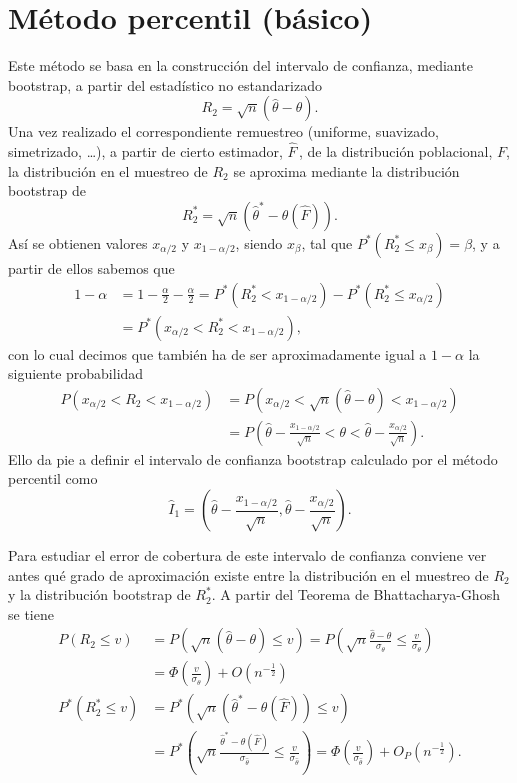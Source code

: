 \documentclass[]{book}
\theoremstyle{definition}
\theoremstyle{definition}
\theoremstyle{definition}
\theoremstyle{remark}
\begin{document}
\section{Método percentil (básico)}\label{cap5_basic}

Este método se basa en la construcción del intervalo de confianza,
mediante bootstrap, a partir del estadístico no estandarizado
\[R_2=\sqrt{n}\left( \hat{\theta}-\theta \right).\] Una vez realizado el
correspondiente remuestreo (uniforme, suavizado, simetrizado, \ldots{}),
a partir de cierto estimador, \(\hat{F}\,\), de la distribución
poblacional, \(F\), la distribución en el muestreo de \(R_2\) se
aproxima mediante la distribución bootstrap de
\[R_2^{\ast}=\sqrt{n}\left( \hat{\theta}^{\ast}-\theta \left( \hat{F}
 \right) \right).\] Así se obtienen valores \(x_{\alpha /2}\) y
\(x_{1-\alpha /2}\), siendo \(x_{\beta }\), tal que
\(P^{\ast}\left( R_2^{\ast }\leq x_{\beta } \right) =\beta\), y a partir
de ellos sabemos que \[\begin{aligned}
1-\alpha &= 1-\frac{\alpha }{2}-\frac{\alpha }{2}=P^{\ast}\left(
R_2^{\ast}<x_{1-\alpha /2} \right) -P^{\ast}\left( R_2^{\ast}\leq
x_{\alpha /2} \right) \\
&= P^{\ast}\left( x_{\alpha /2}<R_2^{\ast}<x_{1-\alpha /2} \right),
\end{aligned}\] con lo cual decimos que también ha de ser
aproximadamente igual a \(1-\alpha\) la siguiente
probabilidad\[\begin{aligned}
P\left( x_{\alpha /2}<R_2<x_{1-\alpha /2} \right) &= P\left( x_{\alpha /2}<
\sqrt{n}\left( \hat{\theta}-\theta \right) <x_{1-\alpha /2} \right) \\
&= P\left( \hat{\theta}-\frac{x_{1-\alpha /2}}{\sqrt{n}}<\theta <\hat{\theta}
-\frac{x_{\alpha /2}}{\sqrt{n}} \right).\end{aligned}\] Ello da pie a
definir el intervalo de confianza bootstrap calculado por el método
percentil como
\[\hat{I}_1=\left( \hat{\theta}-\frac{x_{1-\alpha /2}}{\sqrt{n}},\hat{\theta}
-\frac{x_{\alpha /2}}{\sqrt{n}} \right).\]

Para estudiar el error de cobertura de este intervalo de confianza
conviene ver antes qué grado de aproximación existe entre la
distribución en el muestreo de \(R_2\) y la distribución bootstrap de
\(R_2^{\ast}\). A partir del Teorema de Bhattacharya-Ghosh se
tiene\[\begin{aligned}
P\left( R_2\leq v \right) &= P\left( \sqrt{n}\left( \hat{\theta}-\theta
 \right) \leq v \right) =P\left( \sqrt{n}\frac{\hat{\theta}-\theta }{\sigma
_{\theta }}\leq \frac{v}{\sigma _{\theta }} \right) \\
&= \Phi \left( \frac{v}{\sigma _{\theta }} \right) +O\left( n^{-\frac{1}{2}
} \right) \\
P^{\ast}\left( R_2^{\ast}\leq v \right) &= P^{\ast}\left( \sqrt{n}\left( 
\hat{\theta}^{\ast}-\theta \left( \hat{F} \right) \right) \leq v \right)
\\
&=  P^{\ast}\left( \sqrt{n}\frac{\hat{\theta}^{\ast}-\theta \left( \hat{F}
 \right)}{\sigma _{\hat{\theta}}}\leq \frac{v}{\sigma _{\hat{\theta}}} \right)
=\Phi \left( \frac{v}{\sigma _{\hat{\theta}}} \right) +O_{P}\left( n^{-
\frac{1}{2}} \right).
\end{aligned}\]
\end{document}
